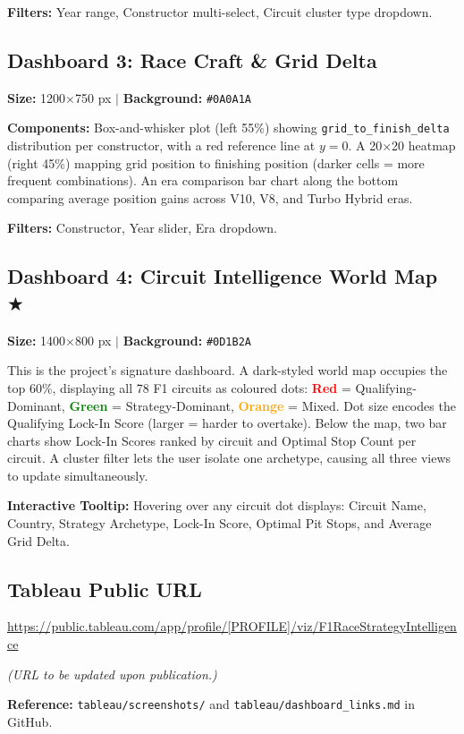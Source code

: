 \documentclass[12pt, a4paper]{article}
\begin{document}
\textbf{Filters:} Year range, Constructor multi-select, Circuit cluster type dropdown.

\subsection{Dashboard 3: Race Craft \& Grid Delta}
\textbf{Size:} 1200$\times$750 px $|$ \textbf{Background:} \texttt{\#0A0A1A}

\textbf{Components:} Box-and-whisker plot (left 55\%) showing \texttt{grid\_to\_finish\_delta} distribution per constructor, with a red reference line at $y = 0$. A 20$\times$20 heatmap (right 45\%) mapping grid position to finishing position (darker cells = more frequent combinations). An era comparison bar chart along the bottom comparing average position gains across V10, V8, and Turbo Hybrid eras.

\textbf{Filters:} Constructor, Year slider, Era dropdown.

\subsection{Dashboard 4: Circuit Intelligence World Map $\bigstar$}
\textbf{Size:} 1400$\times$800 px $|$ \textbf{Background:} \texttt{\#0D1B2A}

This is the project's signature dashboard. A dark-styled world map occupies the top 60\%, displaying all 78 F1 circuits as coloured dots: \textcolor{red}{\textbf{Red}} = Qualifying-Dominant, \textcolor{green}{\textbf{Green}} = Strategy-Dominant, \textcolor{orange}{\textbf{Orange}} = Mixed. Dot size encodes the Qualifying Lock-In Score (larger = harder to overtake). Below the map, two bar charts show Lock-In Scores ranked by circuit and Optimal Stop Count per circuit. A cluster filter lets the user isolate one archetype, causing all three views to update simultaneously.

\textbf{Interactive Tooltip:} Hovering over any circuit dot displays: Circuit Name, Country, Strategy Archetype, Lock-In Score, Optimal Pit Stops, and Average Grid Delta.

\subsection{Tableau Public URL}
\url{https://public.tableau.com/app/profile/[PROFILE]/viz/F1RaceStrategyIntelligence}

\textit{(URL to be updated upon publication.)}

\textbf{Reference:} \texttt{tableau/screenshots/} and \texttt{tableau/dashboard\_links.md} in GitHub.
\end{document}
